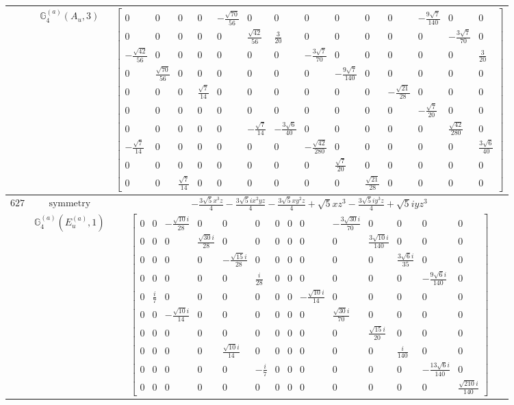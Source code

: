 \documentclass[fleqn,8pt,landscape]{jsarticle}
\begin{document}
\begin{longtable}{ccc}
$  $ & $ \mathbb{G}_{4}^{(a)}(A_{u},3) $ & $ \begin{bmatrix} 0 & 0 & 0 & 0 & - \frac{\sqrt{70}}{56} & 0 & 0 & 0 & 0 & 0 & 0 & - \frac{9 \sqrt{7}}{140} & 0 & 0 \\ 0 & 0 & 0 & 0 & 0 & \frac{\sqrt{42}}{56} & \frac{3}{20} & 0 & 0 & 0 & 0 & 0 & - \frac{3 \sqrt{7}}{70} & 0 \\ - \frac{\sqrt{42}}{56} & 0 & 0 & 0 & 0 & 0 & 0 & - \frac{3 \sqrt{7}}{70} & 0 & 0 & 0 & 0 & 0 & \frac{3}{20} \\ 0 & \frac{\sqrt{70}}{56} & 0 & 0 & 0 & 0 & 0 & 0 & - \frac{9 \sqrt{7}}{140} & 0 & 0 & 0 & 0 & 0 \\ 0 & 0 & 0 & \frac{\sqrt{7}}{14} & 0 & 0 & 0 & 0 & 0 & 0 & - \frac{\sqrt{21}}{28} & 0 & 0 & 0 \\ 0 & 0 & 0 & 0 & 0 & 0 & 0 & 0 & 0 & 0 & 0 & - \frac{\sqrt{7}}{20} & 0 & 0 \\ 0 & 0 & 0 & 0 & 0 & - \frac{\sqrt{7}}{14} & - \frac{3 \sqrt{6}}{40} & 0 & 0 & 0 & 0 & 0 & \frac{\sqrt{42}}{280} & 0 \\ - \frac{\sqrt{7}}{14} & 0 & 0 & 0 & 0 & 0 & 0 & - \frac{\sqrt{42}}{280} & 0 & 0 & 0 & 0 & 0 & \frac{3 \sqrt{6}}{40} \\ 0 & 0 & 0 & 0 & 0 & 0 & 0 & 0 & \frac{\sqrt{7}}{20} & 0 & 0 & 0 & 0 & 0 \\ 0 & 0 & \frac{\sqrt{7}}{14} & 0 & 0 & 0 & 0 & 0 & 0 & \frac{\sqrt{21}}{28} & 0 & 0 & 0 & 0 \end{bmatrix} $ \\ \hline
$ 627 $ & $ \text{symmetry} $ & $ - \frac{3 \sqrt{5} x^{3} z}{4} - \frac{3 \sqrt{5} i x^{2} y z}{4} - \frac{3 \sqrt{5} x y^{2} z}{4} + \sqrt{5} x z^{3} - \frac{3 \sqrt{5} i y^{3} z}{4} + \sqrt{5} i y z^{3} $ \\
$  $ & $ \mathbb{G}_{4}^{(a)}(E_{u}^{(a)},1) $ & $ \begin{bmatrix} 0 & 0 & - \frac{\sqrt{10} i}{28} & 0 & 0 & 0 & 0 & 0 & 0 & - \frac{3 \sqrt{30} i}{70} & 0 & 0 & 0 & 0 \\ 0 & 0 & 0 & \frac{\sqrt{30} i}{28} & 0 & 0 & 0 & 0 & 0 & 0 & \frac{3 \sqrt{10} i}{140} & 0 & 0 & 0 \\ 0 & 0 & 0 & 0 & - \frac{\sqrt{15} i}{28} & 0 & 0 & 0 & 0 & 0 & 0 & \frac{3 \sqrt{6} i}{35} & 0 & 0 \\ 0 & 0 & 0 & 0 & 0 & \frac{i}{28} & 0 & 0 & 0 & 0 & 0 & 0 & - \frac{9 \sqrt{6} i}{140} & 0 \\ 0 & \frac{i}{7} & 0 & 0 & 0 & 0 & 0 & 0 & - \frac{\sqrt{10} i}{14} & 0 & 0 & 0 & 0 & 0 \\ 0 & 0 & - \frac{\sqrt{10} i}{14} & 0 & 0 & 0 & 0 & 0 & 0 & \frac{\sqrt{30} i}{70} & 0 & 0 & 0 & 0 \\ 0 & 0 & 0 & 0 & 0 & 0 & 0 & 0 & 0 & 0 & \frac{\sqrt{15} i}{20} & 0 & 0 & 0 \\ 0 & 0 & 0 & 0 & \frac{\sqrt{10} i}{14} & 0 & 0 & 0 & 0 & 0 & 0 & \frac{i}{140} & 0 & 0 \\ 0 & 0 & 0 & 0 & 0 & - \frac{i}{7} & 0 & 0 & 0 & 0 & 0 & 0 & - \frac{13 \sqrt{6} i}{140} & 0 \\ 0 & 0 & 0 & 0 & 0 & 0 & 0 & 0 & 0 & 0 & 0 & 0 & 0 & \frac{\sqrt{210} i}{140} \end{bmatrix} $ \\ \hline

\end{longtable}
\end{document}
